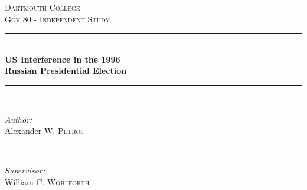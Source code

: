 
\begin{titlingpage}

\newcommand{\HRule}{\rule{\linewidth}{0.5mm}} %

\center %


\textsc{\LARGE Dartmouth College}\\[1.5cm] %
\textsc{\Large Gov 80 - Independent Study}\\[0.5cm] %


\HRule \\[0.4cm]
{ \huge \bfseries US Interference in the 1996}\\[0.3cm] %
{ \huge \bfseries Russian Presidential Election}\\[0.4cm]
\HRule \\[1.5cm]


\begin{minipage}{0.4\textwidth}
\begin{flushleft} \large
\emph{Author:}\\
Alexander W. \textsc{Petros} %
\end{flushleft}
\end{minipage}
~
\begin{minipage}{0.4\textwidth}
\begin{flushright} \large
\emph{Supervisor:} \\
William C. \textsc{Wohlforth} %
\end{flushright}
\end{minipage}\\[2cm]


\end{titlingpage}
